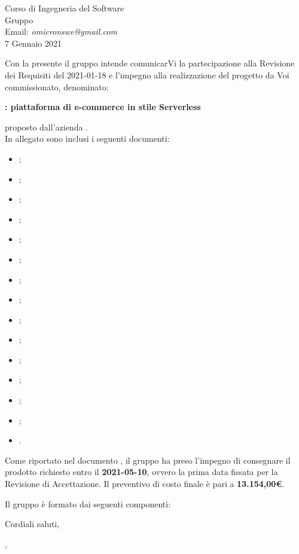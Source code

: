 \documentclass[12pt,a4paper]{letter}
\begin{document}
\begin{letter}
{\begin{flushleft}
			\vspace{1cm}
            Corso di Ingegneria del Software\\ Gruppo \Omicron{}\\ Email:  \textit{omicronswe@gmail.com} \\ 7 Gennaio 2021 
        \end{flushleft}
        }
        \opening{ Con la presente il gruppo \Omicron{} intende comunicarVi la partecipazione alla Revisione dei Requisiti del 2021-01-18 e l'impegno alla realizzazione del progetto da Voi commissionato, denominato:}
        \begin{center}
           \textbf{\nameproject{} : piattaforma di e-commerce in stile Serverless} 
        \end{center}
        proposto dall'azienda \textit{\Proponente{}}.\\
        In allegato sono inclusi i seguenti documenti:
            \begin{itemize}
                \item {};
                \item {};
                \item {};
                \item {};
                \item {};
                \item {};
                \item {};
                \item {};
                \item {};
                \item {};
                \item {};
                \item {};
                \item {};
                \item {};
                \item {}.
            \end{itemize}
        
        Come riportato nel documento , il gruppo ha preso l'impegno di consegnare il prodotto richiesto entro il \textbf{2021-05-10}, ovvero la prima data fissata per la Revisione di Accettazione. Il preventivo di costo finale è pari a \textbf{13.154,00\euro{}}.
        
        Il gruppo è formato dai seguenti componenti:

        Cordiali saluti,
        \closing{\MB{}, \\ \textit{\respProg{}}}

    \end{letter}
\end{document}
